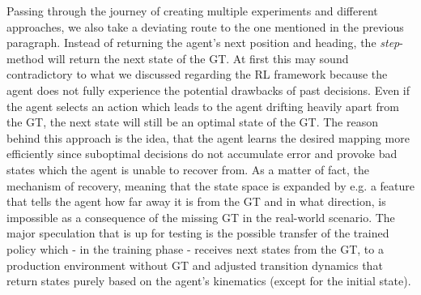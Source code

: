 Passing through the journey of creating multiple experiments and different approaches, we also take a deviating route to the one mentioned in the previous paragraph. Instead of returning the agent's next position and heading, the \textit{step}-method will return the next state of the GT. At first this may sound contradictory to what we discussed regarding the RL framework because the agent does not fully experience the potential drawbacks of past decisions. Even if the agent selects an action which leads to the agent drifting heavily apart from the GT, the next state will still be an optimal state of the GT. The reason behind this approach is the idea, that the agent learns the desired mapping more efficiently since suboptimal decisions do not accumulate error and provoke bad states which the agent is unable to recover from. As a matter of fact, the mechanism of recovery, meaning that the state space is expanded by e.g. a feature that tells the agent how far away it is from the GT and in what direction, is impossible as a consequence of the missing GT in the real-world scenario. The major speculation that is up for testing is the possible transfer of the trained policy which - in the training phase - receives next states from the GT, to a production environment without GT and adjusted transition dynamics that return states purely based on the agent's kinematics (except for the initial state).